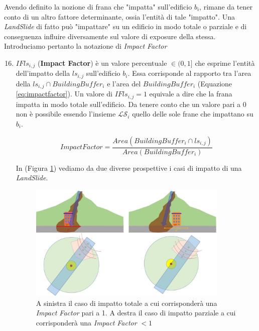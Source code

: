 Avendo definito la nozione di frana che "impatta" sull'edificio $b_i$, rimane da tener conto di un altro fattore determinante, ossia l'entità di tale "impatto". Una \textit{LandSlide} di fatto può "impattare" su un edificio in modo totale o parziale e di conseguenza influire diversamente sul valore di exposure della stessa. Introduciamo pertanto la notazione di \textit{Impact Factor}

\begin{enumerate}
	\setcounter{enumi}{15}
	
	\item \textbf{$IFls_{i,j}$} (\textbf{Impact Factor}) è un valore percentuale $\in(0,1]$ che esprime l'entità dell'impatto della $ls_{i,j}$ sull'edificio $b_i$. Essa corrisponde al rapporto tra l'area della $ls_{i,j} \cap BuildingBuffer_i$ e l'area del $BuildingBuffer_i$ (Equazione \ref{eq:impactfactor}). Un valore di $IFls_{i,j}=1$ equivale a dire che la frana impatta in modo totale sull'edificio. Da tenere conto che un valore pari a 0 non è possibile essendo l'insieme $ \mathcal{LS}_i $ quello delle sole frane che impattano su $b_i$.
	
	\begin{equation}\label{eq:impactfactor}
	ImpactFactor=\frac{Area(BuildingBuffer_i \cap ls_{i,j})}{Area(BuildingBuffer_i)}
	\end{equation}
	
	In (Figura \ref{impact_factor}) vediamo da due diverse prospettive i casi di impatto di una \textit{LandSlide}.
	
	\begin{figure}[h]
		\centering
		\includegraphics[width=0.9\textwidth]{images/landslide5}
		\caption{A sinistra il caso di impatto totale a cui corrisponderà una \textit{Impact Factor} pari a 1. A destra il caso di impatto parziale a cui corrisponderà una \textit{Impact Factor} $<1$  }
		\label{impact_factor}
	\end{figure}
	
\end{enumerate}

